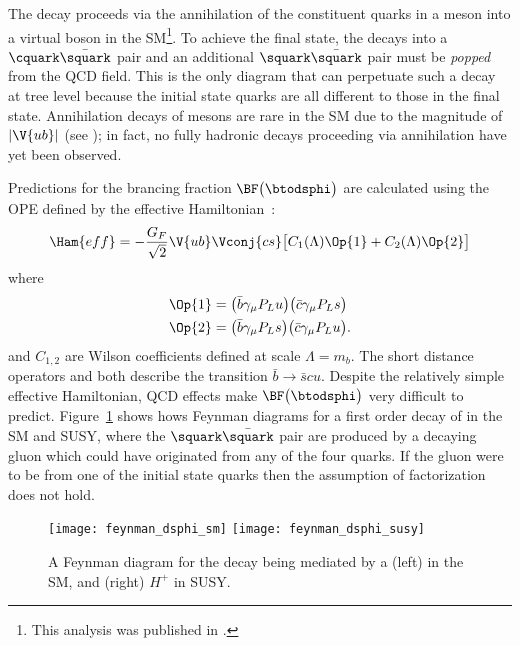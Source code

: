 The decay \btodsphi proceeds via the annihilation of the constituent quarks in a \Bp meson into
a virtual \Wp boson in the SM\footnote{
  This analysis was published in .}.
To achieve the final state, the \Wp decays into a $\cquark\bar\squark$ pair and an additional
$\squark\bar\squark$ pair must be \emph{popped} from the QCD field.
This is the only diagram that can perpetuate such a decay at tree level because the initial state
quarks are all different to those in the final state.
Annihilation decays of \Bp mesons are rare in the SM due to the magnitude of $|\V{ub}|$ (see
); in fact, no fully hadronic decays proceeding via annihilation have yet been
observed.


Predictions for the brancing fraction $\BF\big(\btodsphi\big)$ are calculated using the OPE defined
by the effective Hamiltonian~\cite{Zou:2009zza,Mohanta:2002wf,PhysRevD.76.057701,Lu:2001yz}:
\begin{equation}
  \Ham{eff}=
  -\frac{G_F}{\sqrt{2}} \V{ub}\Vconj{cs}
  \big[
    C_1(\Lambda)\Op{1}+C_2(\Lambda)\Op{2}
    \big]
\end{equation}
where
\begin{align}
  \Op{1} &= \big(\bar b\gamma_\mu P_Lu\big) \big(\bar c\gamma_\mu P_Ls\big) \nonumber\\
  \Op{2} &= \big(\bar b\gamma_\mu P_Ls\big) \big(\bar c\gamma_\mu P_Lu\big).
\end{align}
and $C_{1,2}$ are Wilson coefficients defined at scale $\Lambda=m_b$.
The short distance operators  and  both describe the transition $\bar b\!\to\bar scu$.
Despite the relatively simple effective Hamiltonian, QCD effects make $\BF\big(\btodsphi\big)$ very
difficult to predict.
Figure~\ref{fig:dsphi:feyn} shows hows Feynman diagrams for a first order decay of \btodsphi in the
SM and SUSY, where the $\squark\bar\squark$ pair are produced by a decaying gluon which could have
originated from any of the four quarks.
If the gluon were to be from one of the initial state quarks then the assumption of factorization
does not hold.


\begin{figure}
  \begin{center}
    \texttt{[image: feynman\_dsphi\_sm]}
    \texttt{[image: feynman\_dsphi\_susy]}
    \caption[Feynman diagram for the decay \btodsphi]
    {\small
      A Feynman diagram for the decay \btodsphi being mediated by a
      (left) \Wp in the SM, and
      (right) $H^+$ in SUSY.
    }
    \label{fig:dsphi:feyn}
  \end{center}
\end{figure}


